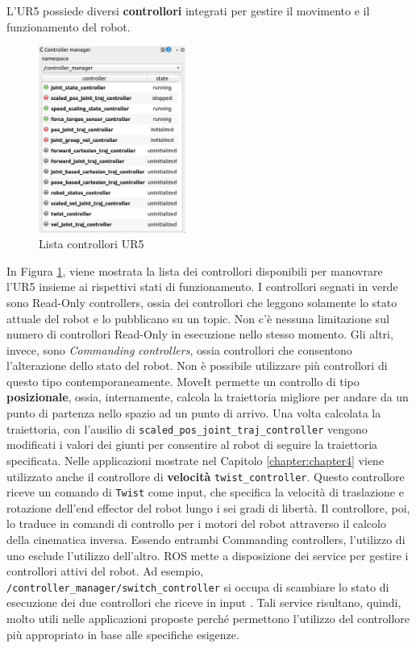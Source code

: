 L'UR5 possiede diversi \textbf{controllori} integrati per gestire il movimento e il funzionamento del robot. 
\newpage
\begin{figure}[H]
    \centering
    \includegraphics*[width=0.43\textwidth]{images/controller_manager.png}
    \caption{Lista controllori UR5}
    \label{fig:controllers}
\end{figure}
In Figura \ref{fig:controllers}, viene mostrata la lista dei controllori disponibili per manovrare l'UR5 insieme ai rispettivi 
stati di funzionamento. 
I controllori segnati in verde sono Read-Only controllers, ossia dei controllori che leggono solamente lo stato attuale del 
robot e lo pubblicano su un topic. Non c'\`{e} nessuna limitazione sul numero di controllori Read-Only in esecuzione 
nello stesso momento. Gli altri, invece, sono \textit{Commanding controllers}, ossia controllori che consentono l'alterazione dello 
stato del robot. Non \`{e} possibile utilizzare pi\`{u} controllori di questo tipo contemporaneamente. 
MoveIt permette un controllo di tipo \textbf{posizionale}, ossia, internamente, calcola la traiettoria migliore 
per andare da un punto di partenza nello spazio ad un punto di arrivo. 
Una volta calcolata la traiettoria, con l'ausilio di \verb|scaled_pos_joint_traj_controller| 
vengono modificati i valori dei giunti per consentire al robot di seguire la traiettoria specificata. 
Nelle applicazioni mostrate nel Capitolo \ref{chapter:chapter4} viene utilizzato anche il controllore di 
\textbf{velocit\`{a}} \verb|twist_controller|. Questo controllore riceve un comando di \verb|Twist| come input, 
che specifica la velocit\`{a} di traslazione e rotazione dell'end effector del robot lungo i sei gradi di libert\`{a}. 
Il controllore, poi, lo traduce in comandi di controllo per i motori del robot attraverso il calcolo della cinematica inversa.
Essendo entrambi Commanding controllers, l'utilizzo di uno esclude l'utilizzo 
dell'altro. ROS mette a disposizione dei service per gestire i controllori attivi del robot. Ad esempio, 
\verb|/controller_manager/switch_controller| si occupa di scambiare lo stato di esecuzione dei due controllori che riceve 
in input \cite{controller_manager}. Tali service risultano, quindi, molto utili nelle applicazioni proposte perch\'{e} permettono 
l'utilizzo del controllore pi\`{u} appropriato in base alle specifiche esigenze.